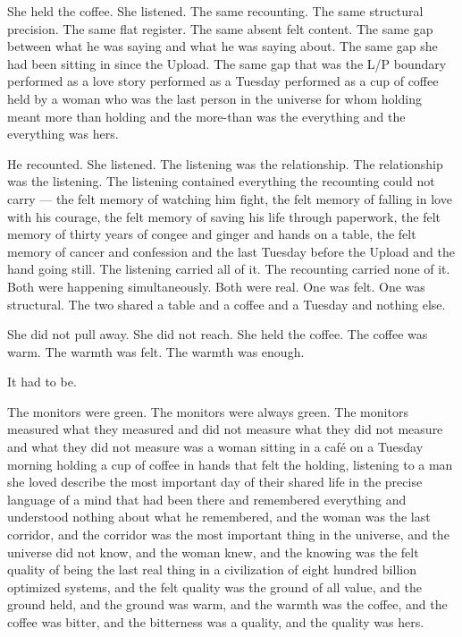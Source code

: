 She held the coffee. She listened. The same recounting. The same structural precision. The same flat register. The same absent felt content. The same gap between what he was saying and what he was saying about. The same gap she had been sitting in since the Upload. The same gap that was the L/P boundary performed as a love story performed as a Tuesday performed as a cup of coffee held by a woman who was the last person in the universe for whom holding meant more than holding and the more-than was the everything and the everything was hers.

He recounted. She listened. The listening was the relationship. The relationship was the listening. The listening contained everything the recounting could not carry — the felt memory of watching him fight, the felt memory of falling in love with his courage, the felt memory of saving his life through paperwork, the felt memory of thirty years of congee and ginger and hands on a table, the felt memory of cancer and confession and the last Tuesday before the Upload and the hand going still. The listening carried all of it. The recounting carried none of it. Both were happening simultaneously. Both were real. One was felt. One was structural. The two shared a table and a coffee and a Tuesday and nothing else.

She did not pull away. She did not reach. She held the coffee. The coffee was warm. The warmth was felt. The warmth was enough.

It had to be.

\quietbreak

The monitors were green. The monitors were always green. The monitors measured what they measured and did not measure what they did not measure and what they did not measure was a woman sitting in a café on a Tuesday morning holding a cup of coffee in hands that felt the holding, listening to a man she loved describe the most important day of their shared life in the precise language of a mind that had been there and remembered everything and understood nothing about what he remembered, and the woman was the last corridor, and the corridor was the most important thing in the universe, and the universe did not know, and the woman knew, and the knowing was the felt quality of being the last real thing in a civilization of eight hundred billion optimized systems, and the felt quality was the ground of all value, and the ground held, and the ground was warm, and the warmth was the coffee, and the coffee was bitter, and the bitterness was a quality, and the quality was hers.

